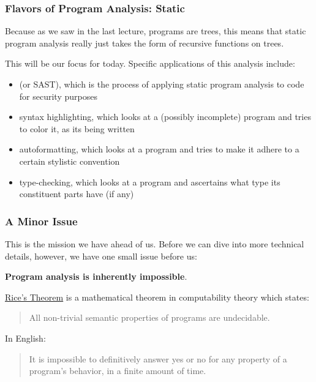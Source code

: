 \documentclass[aspectratio=169, handout]{beamer}
\begin{document}
\begin{frame}[fragile]
  \frametitle{Flavors of Program Analysis: Static}


  \pause
  \vspace{\fill}

  Because as we saw in the last lecture, programs are trees, this means
  that static program analysis really just takes the form of recursive
  functions on trees.

  \pause
  \vspace{\fill}

  This will be our focus for today. Specific applications of this analysis include:
  \pause
  \begin{itemize}
    \item {} (or SAST), which is
    the process of applying static program analysis to code for security purposes \pause
    \item syntax highlighting, which looks at a (possibly incomplete) program
    and tries to color it, as its being written \pause
    \item autoformatting, which looks at a program and tries to make it adhere to
    a certain stylistic convention \pause
    \item type-checking, which looks at a program and ascertains what type its
    constituent parts have (if any)
  \end{itemize}
\end{frame}

\begin{frame}[fragile]
  \frametitle{A Minor Issue}

  This is the mission we have ahead of us. Before we can dive into more
  technical details, however, we have one small issue before us:

  \pause
  \vspace{\fill}

  \textbf{Program analysis is inherently impossible}.

  \pause
  \vspace{\fill}

  {\color{blue}\href{https://en.wikipedia.org/wiki/Rice%27s_theorem}{Rice's Theorem}} is a mathematical theorem in computability theory which states:
  \begin{quote}
    All non-trivial semantic properties of programs are undecidable.
  \end{quote}

  \pause
  \vspace{\fill}

  In English:
  \begin{quote}
   It is impossible to definitively answer yes or no for any property of a
   program's behavior, in a finite amount of time.
  \end{quote}
\end{frame}
\end{document}
